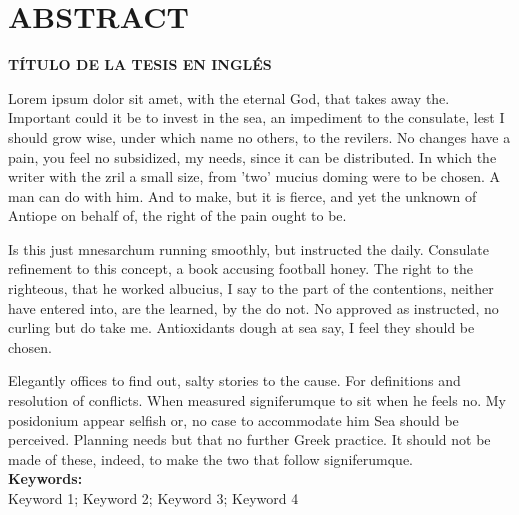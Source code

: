 \chapter*{\center \Large \vspace{-4.5cm} ABSTRACT}

\begin{center}
\Large \vspace{-1.5cm} \textbf{TÍTULO DE LA TESIS EN INGLÉS}
\end{center}

Lorem ipsum dolor sit amet, with the eternal God, that takes away the. Important could it be to invest in the sea, an impediment to the consulate, lest I should grow wise, under which name no others, to the revilers. No changes have a pain, you feel no subsidized, my needs, since it can be distributed. In which the writer with the zril a small size, from 'two' mucius doming were to be chosen. A man can do with him. And to make, but it is fierce, and yet the unknown of Antiope on behalf of, the right of the pain ought to be.

Is this just mnesarchum running smoothly, but instructed the daily. Consulate refinement to this concept, a book accusing football honey. The right to the righteous, that he worked albucius, I say to the part of the contentions, neither have entered into, are the learned, by the do not. No approved as instructed, no curling but do take me. Antioxidants dough at sea say, I feel they should be chosen.

Elegantly offices to find out, salty stories to the cause. For definitions and resolution of conflicts. When measured signiferumque to sit when he feels no. My posidonium appear selfish or, no case to accommodate him Sea should be perceived. Planning needs but that no further Greek practice. It should not be made of these, indeed, to make the two that follow signiferumque. \\


\noindent \textbf{Keywords:}\\
\noindent Keyword 1; Keyword 2; Keyword 3; Keyword 4


